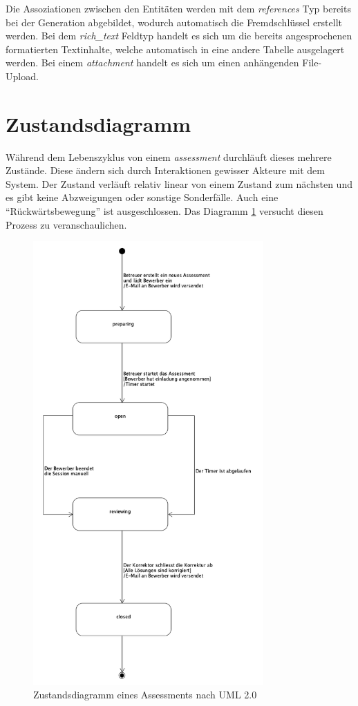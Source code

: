 Die Assoziationen zwischen den Entitäten werden mit dem \emph{references} Typ bereits bei der Generation abgebildet, wodurch
automatisch die Fremdschlüssel erstellt werden. Bei dem \emph{rich\_text} Feldtyp handelt es sich um die bereits angesprochenen formatierten Textinhalte,
welche automatisch in eine andere Tabelle ausgelagert werden. Bei einem \emph{attachment} handelt es sich um einen anhängenden File-Upload.

\newpage

\section{Zustandsdiagramm}

Während dem Lebenszyklus von einem \emph{assessment} durchläuft dieses mehrere Zustände. Diese ändern
sich durch Interaktionen gewisser Akteure mit dem System. Der Zustand verläuft relativ linear von einem Zustand zum nächsten und es gibt keine Abzweigungen
oder sonstige Sonderfälle. Auch eine \enquote{Rückwärtsbewegung} ist ausgeschlossen. Das Diagramm \ref{fig:state-diagram} versucht diesen Prozess zu veranschaulichen.

\begin{figure}[H]
    \centering
    \includegraphics[height=17cm]{images/diagrams/state.png}
    \caption{\label{fig:state-diagram}Zustandsdiagramm eines Assessments nach UML 2.0}
\end{figure}

